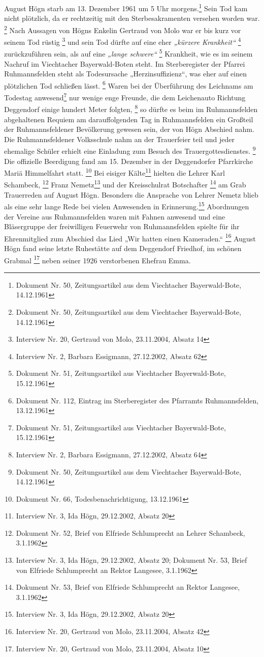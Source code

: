 \documentclass[a4paper]{article}
\newcommand\textstyleZitate[1]{\textit{#1}}
\begin{document}
August Högn starb am 13. Dezember 1961 um 5 Uhr morgens.\footnote{
Dokument Nr. 50, Zeitungsartikel aus dem Viechtacher Bayerwald-Bote,
14.12.1961} Sein Tod kam nicht plötzlich, da er rechtzeitig mit den
Sterbesakramenten versehen worden war. \footnote{Dokument Nr. 50,
Zeitungsartikel aus dem Viechtacher Bayerwald-Bote, 14.12.1961} Nach
Aussagen von Högns Enkelin Gertraud von Molo war er bis kurz vor seinem
Tod rüstig \footnote{Interview Nr. 20, Gertraud von Molo, 23.11.2004,
Absatz 14} und sein Tod dürfte auf eine eher \textstyleZitate{„kürzere
Krankheit“ } \footnote{Interview Nr. 2, Barbara Essigmann, 27.12.2002,
Absatz 62} zurückzuführen sein, als auf eine \textstyleZitate{„lange
schwere“}  \footnote{Dokument Nr. 51, Zeitungsartikel aus Viechtacher
Bayerwald-Bote, 15.12.1961} Krankheit, wie es im seinem Nachruf im
Viechtacher Bayerwald-Boten steht. Im Sterberegister der Pfarrei
Ruhmannsfelden steht als Todesursache „Herzinsuffizienz“, was eher auf
einen plötzlichen Tod schließen lässt. \footnote{Dokument Nr. 112,
Eintrag im Sterberegister des Pfarramts Ruhmannsfelden, 13.12.1961}
Waren bei der Überführung des Leichnams am Todestag anwesend\footnote{
Dokument Nr. 51, Zeitungsartikel aus Viechtacher Bayerwald-Bote,
15.12.1961} nur wenige enge Freunde, die dem Leichenauto Richtung
Deggendorf einige hundert Meter folgten, \footnote{Interview Nr. 2,
Barbara Essigmann, 27.12.2002, Absatz 64} so dürfte es beim im
Ruhmannsfelden abgehaltenen Requiem am darauffolgenden Tag in
Ruhmannsfelden ein Großteil der Ruhmannsfeldener Bevölkerung gewesen
sein, der von Högn Abschied nahm. Die Ruhmannsfeldener Volksschule nahm
an der Trauerfeier teil und jeder ehemalige Schüler erhielt eine
Einladung zum Besuch des Trauergottesdienstes. \footnote{Dokument Nr.
50, Zeitungsartikel aus dem Viechtacher Bayerwald-Bote, 14.12.1961} Die
offizielle Beerdigung fand am 15. Dezember in der Deggendorfer
Pfarrkirche Mariä Himmelfahrt statt. \footnote{Dokument Nr. 66,
Todesbenachrichtigung, 13.12.1961} Bei eisiger Kälte\footnote{
Interview Nr. 3, Ida Högn, 29.12.2002, Absatz 20} hielten die Lehrer
Karl Schambeck, \footnote{Dokument Nr. 52, Brief von Elfriede
Schlumprecht an Lehrer Schambeck, 3.1.1962} Franz Nemetz\footnote{
Interview Nr. 3, Ida Högn, 29.12.2002, Absatz 20; Dokument Nr. 53,
Brief von Elfriede Schlumprecht an Rektor Langesee, 3.1.1962} und der
Kreisschulrat Botschafter \footnote{Dokument Nr. 53, Brief von Elfriede
Schlumprecht an Rektor Langesee, 3.1.1962} am Grab Trauerreden auf
August Högn. Besonders die Ansprache von Lehrer Nemetz blieb als eine
sehr lange Rede bei vielen Anwesenden in Erinnerung.\footnote{
Interview Nr. 3, Ida Högn, 29.12.2002, Absatz 20} Abordnungen der
Vereine aus Ruhmannsfelden waren mit Fahnen anwesend und eine
Bläsergruppe der freiwilligen Feuerwehr von Ruhmannsfelden spielte für
ihr Ehrenmitglied zum Abschied das Lied „Wir hatten einen Kameraden.“
 \footnote{Interview Nr. 20, Gertraud von Molo, 23.11.2004, Absatz 42}
August Högn fand seine letzte Ruhestätte auf dem Deggendorf Friedhof,
im schönen Grabmal \footnote{Interview Nr. 20, Gertraud von Molo,
23.11.2004, Absatz 10} neben seiner 1926 verstorbenen Ehefrau Emma.
\end{document}
